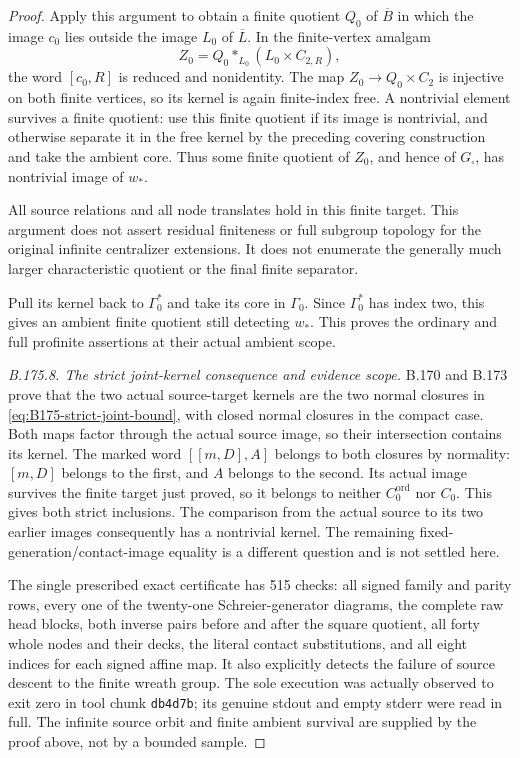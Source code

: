 \begin{proof}
Apply this argument to obtain a finite quotient \(Q_0\) of
\(\overline B\) in which the image \(c_0\) lies outside the image
\(L_0\) of \(\overline L\). In the finite-vertex amalgam
\[
                    Z_0=Q_0*_{L_0}(L_0\times C_{2,R}),
\]
the word \([c_0,R]\) is reduced and nonidentity.
The map \(Z_0\to Q_0\times C_2\) is injective on both finite
vertices, so its kernel is again finite-index free. A nontrivial
element survives a finite quotient: use this finite quotient if its
image is nontrivial, and otherwise separate it in the free kernel
by the preceding covering construction and take the ambient core.
Thus some finite quotient of \(Z_0\), and hence of \(G_\square\),
has nontrivial image of \(w_*\).

All source relations and all node translates hold in this finite
target. This argument does not assert residual finiteness or full
subgroup topology for the original infinite centralizer extensions.
It does not enumerate the generally much larger characteristic
quotient or the final finite separator.

Pull its kernel back to \(\Gamma _0^*\) and take its core in
\(\Gamma _0\). Since \(\Gamma _0^*\) has index two, this gives an
ambient finite quotient still detecting \(w_*\). This proves the
ordinary and full profinite assertions at their actual ambient scope.

\emph{B.175.8. The strict joint-kernel consequence and evidence scope.}
B.170 and B.173 prove that the two actual source-target kernels are
the two normal closures in \eqref{eq:B175-strict-joint-bound}, with
closed normal closures in the compact case. Both maps factor through
the actual source image, so their intersection contains its kernel.
The marked word \([[m,D],A]\) belongs to both closures by normality:
\([m,D]\) belongs to the first, and \(A\) belongs to the second.
Its actual image survives the finite target just proved, so it belongs
to neither \(C_0^{\mathrm{ord}}\) nor \(C_0\). This gives both
strict inclusions. The comparison from the actual source to its two
earlier images consequently has a nontrivial kernel. The remaining
fixed-generation/contact-image equality is a different question and
is not settled here.

The single prescribed exact certificate has 515 checks: all signed
family and parity rows, every one of the twenty-one Schreier-generator
diagrams, the complete raw head blocks, both inverse pairs before and
after the square quotient, all forty whole nodes and their decks, the
literal contact substitutions, and all eight indices for each signed
affine map. It also explicitly detects the failure of source descent
to the finite wreath group. The sole execution was actually observed
to exit zero in tool chunk \texttt{db4d7b}; its genuine stdout and empty
stderr were read in full. The infinite source orbit and finite ambient
survival are supplied by the proof above, not by a bounded sample.
\end{proof}


